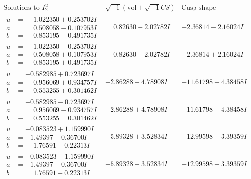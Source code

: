 \documentclass[1p]{elsarticle_modified}
\theoremstyle{definition}
\newcommand{\I}{\sqrt{-1}}
\begin{document}
$$\begin{array}{c|c|c}  
\text{Solutions to }I^u_{2}& \I (\text{vol} + \sqrt{-1}CS) & \text{Cusp shape}\\
 \hline 
\begin{aligned}
u &= \phantom{-}1.022350 + 0.253702 I \\
a &= \phantom{-}0.508058 - 0.107953 I \\
b &= \phantom{-}0.853195 - 0.491735 I\end{aligned}
 & \phantom{-}0.82630 + 2.02782 I & -2.36814 - 2.16024 I \\ \hline\begin{aligned}
u &= \phantom{-}1.022350 - 0.253702 I \\
a &= \phantom{-}0.508058 + 0.107953 I \\
b &= \phantom{-}0.853195 + 0.491735 I\end{aligned}
 & \phantom{-}0.82630 - 2.02782 I & -2.36814 + 2.16024 I \\ \hline\begin{aligned}
u &= -0.582985 + 0.723697 I \\
a &= \phantom{-}0.956069 + 0.934757 I \\
b &= \phantom{-}0.553255 + 0.301462 I\end{aligned}
 & -2.86288 - 4.78908 I & -11.61798 + 4.38458 I \\ \hline\begin{aligned}
u &= -0.582985 - 0.723697 I \\
a &= \phantom{-}0.956069 - 0.934757 I \\
b &= \phantom{-}0.553255 - 0.301462 I\end{aligned}
 & -2.86288 + 4.78908 I & -11.61798 - 4.38458 I \\ \hline\begin{aligned}
u &= -0.083523 + 1.159990 I \\
a &= -1.49397 - 0.36700 I \\
b &= \phantom{-}1.76591 + 0.22313 I\end{aligned}
 & -5.89328 + 3.52834 I & -12.99598 - 3.39359 I \\ \hline\begin{aligned}
u &= -0.083523 - 1.159990 I \\
a &= -1.49397 + 0.36700 I \\
b &= \phantom{-}1.76591 - 0.22313 I\end{aligned}
 & -5.89328 - 3.52834 I & -12.99598 + 3.39359 I \\ \hline\begin{aligned}

\end{aligned}
\end{array}$$
\end{document}
